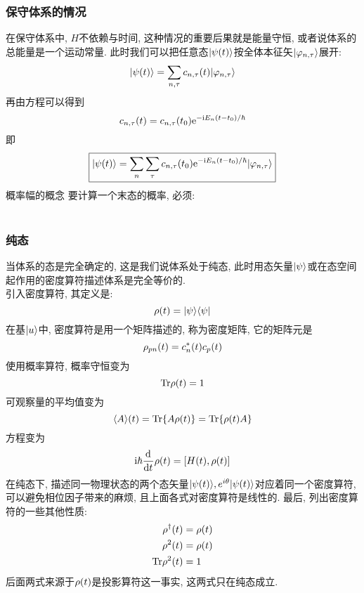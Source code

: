 \documentclass[UTF8]{ctexart}
\numberwithin{equation}{subsection}
\begin{document}
\subsubsection*{保守体系的情况}
在保守体系中, $H$不依赖与时间, 这种情况的重要后果就是能量守恒, 或者说体系的总能量是一个运动常量. 此时我们可以把任意态$| {\psi(t)} \rangle$按全体本征矢$| {\varphi_{n,\tau}} \rangle$展开:
$$| {\psi(t)} \rangle=\sum_{n,\tau}c_{n,\tau}(t)| {\varphi_{n,\tau}} \rangle$$
再由\sch 方程可以得到
$$c_{n,\tau}(t)=c_{n,\tau}(t_0)\mathrm{e}^{-\mathrm{i} E_n(t-t_0)/\hbar}$$
即
\begin{equation}\boxed{
    | {\psi(t)} \rangle=\sum_n\sum_\tau c_{n,\tau}(t_0)\mathrm{e}^{-\mathrm{i} E_n(t-t_0)/\hbar}| {\varphi_{n,\tau}} \rangle  \label{D54}
}\end{equation}
概率幅的概念
要计算一个末态的概率, 必须:\\ \\
\subsubsection*{纯态}
当体系的态是完全确定的, 这是我们说体系处于纯态, 此时用态矢量$| {\psi} \rangle$或在态空间起作用的密度算符描述体系是完全等价的. \\
引入密度算符, 其定义是:
$$\rho(t)=| {\psi} \rangle\langle {\psi} |$$
在基$| {u} \rangle$中, 密度算符是用一个矩阵描述的, 称为密度矩阵, 它的矩阵元是
$$\rho_{pn}(t)=c_n^*(t)c_p(t)$$
使用概率算符, 概率守恒变为
$$\mathop{}\!\mathrm{Tr}\rho(t)=1$$
可观察量的平均值变为
$$\langle {A} \rangle(t)=\mathop{}\!\mathrm{Tr}\{A\rho(t)\}=\mathop{}\!\mathrm{Tr}\{\rho(t)A\}$$
\sch 方程变为
$$\mathrm{i}\hbar\frac{\mathrm{d}^{} }{\mathrm{d} t^{}}\rho(t)=[H(t),\rho(t)]$$
在纯态下, 描述同一物理状态的两个态矢量$| {\psi(t)} \rangle,e^{i\theta}| {\psi(t)} \rangle$对应着同一个密度算符, 可以避免相位因子带来的麻烦, 且上面各式对密度算符是线性的. 最后, 列出密度算符的一些其他性质:
$$\begin{aligned} 
    \rho^{\dagger}(t)&=\rho(t)\\
    \rho^2(t)&=\rho(t)\\
    \mathop{}\!\mathrm{Tr}\rho^2(t)&=1
 \end{aligned}$$
后面两式来源于$\rho(t)$是投影算符这一事实, 这两式只在纯态成立.
\end{document}
